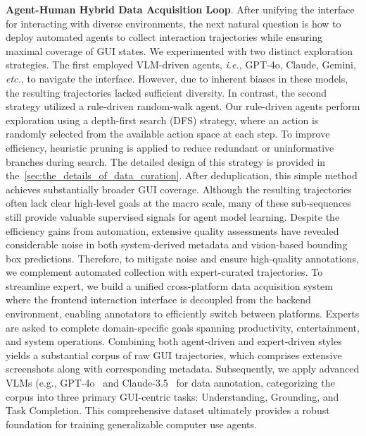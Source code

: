 \documentclass{article} %
\def\ie{\emph{i.e.}}
\def\etc{\emph{etc.}}
\begin{document}
\textbf{Agent-Human Hybrid Data Acquisition Loop}. After unifying the interface for interacting with diverse environments, the next natural question is how to deploy automated agents to collect interaction trajectories while ensuring maximal coverage of GUI states. We experimented with two distinct exploration strategies. The first employed VLM-driven agents, \ie, GPT‑4o, Claude, Gemini, \etc, to navigate the interface. However, due to inherent biases in these models, the resulting trajectories lacked sufficient diversity. In contrast, the second strategy utilized a rule‑driven random‑walk agent. Our rule-driven agents perform exploration using a depth-first search (DFS) strategy, where an action is randomly selected from the available action space at each step. To improve efficiency, heuristic pruning is applied to reduce redundant or uninformative branches during search. The detailed design of this strategy is provided in the~\ref{sec:the_details_of_data_curation}. After deduplication, this simple method achieves substantially broader GUI coverage. Although the resulting trajectories often lack clear high‑level goals at the macro scale, many of these sub‑sequences still provide valuable supervised signals for agent model learning.
% 
Despite the efficiency gains from automation, extensive quality assessments have revealed considerable noise in both system-derived metadata and vision-based bounding box predictions. Therefore, to mitigate noise and ensure high-quality annotations, we complement automated collection with expert-curated trajectories. 
To streamline expert, we build a unified cross-platform data acquisition system where the frontend interaction interface is decoupled from the backend environment, enabling annotators to efficiently switch between platforms. Experts are asked to complete domain-specific goals spanning productivity, entertainment, and system operations.
% 
Combining both agent-driven and expert-driven styles yields a substantial corpus of raw GUI trajectories, which comprises extensive screenshots along with corresponding metadata. Subsequently, we apply advanced VLMs (e.g., GPT-4o~\citep{hurst2024gpt} and Claude-3.5~\citep{anthropic2024claude35} for data annotation, categorizing the corpus into three primary GUI-centric tasks: Understanding, Grounding, and Task Completion. This comprehensive dataset ultimately provides a robust foundation for training generalizable computer use agents.
\end{document}
